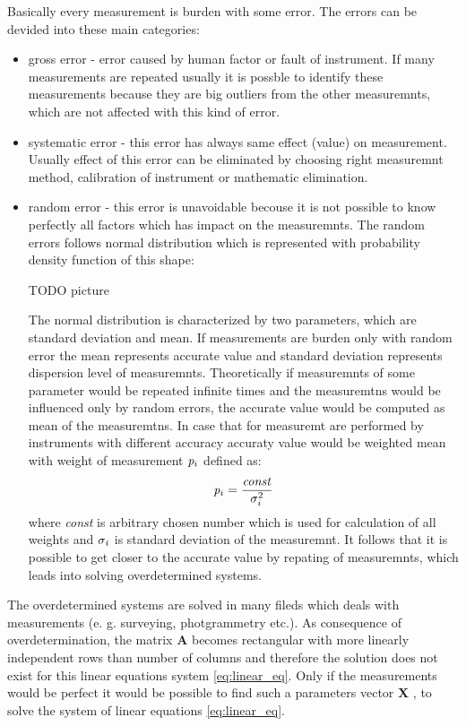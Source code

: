 \documentclass[a4paper,12pt]{report}
\newcommand{\ematr}[1]{
{\bf #1}
}
\newcommand{\evect}[1]{
{\bf #1}
}
\newcommand{\escal}[1]{
{\it #1}
}
\begin{document}
Basically every measurement is burden with some error. The errors can be devided into these main categories:  
\begin{itemize}
\item gross error - error caused by human factor or fault of instrument. If many measurements are repeated
usually it is possble to identify these measurements because they are big outliers from the other measuremnts, which are not affected with this 
kind of error.
\item systematic error - this error has always same effect (value) on measurement.  Usually effect of this error can be 
eliminated by choosing right measuremnt method, calibration of instrument or mathematic elimination.
\item random error - this error is unavoidable becouse it is not possible to know perfectly all factors which has impact 
on the measuremnts. The random errors follows normal distribution which is represented with probability density function of this shape:

TODO picture


The normal distribution is characterized by two parameters, which are standard deviation and  mean. 
If measurements are burden only with random error the mean represents accurate value and standard deviation represents 
dispersion level of measuremnts. 
Theoretically  if measuremnts of some parameter would be repeated infinite times and the measuremtns would be influenced only by random errors,
the accurate value would be computed as  mean of the measuremtns. In case that for measuremt are performed by instruments with different accuracy
 accuraty value would be weighted mean with weight of measurement $\escal{p}_{i}$ defined as:
\begin{equation}
\escal{p}_{i} = \frac{\escal{const}}{\escal{\sigma}_{i}^{2}}
\end{equation} 
where \escal{const} is arbitrary chosen number which is used for calculation of all weights and $\escal{\sigma_{i}}$ is standard deviation of the measuremnt.
It follows that it is possible to get closer to the accurate value by repating of measuremnts, which 
leads into solving overdetermined systems. 

\end{itemize}

The overdetermined systems are solved in many fileds which deals with measurements (e. g. 
surveying, photgrammetry etc.).
As consequence of overdetermination, the matrix \ematr{A} becomes rectangular with more linearly independent rows than  number of columns 
and therefore the solution does not exist for this linear equations system \eqref{eq:linear_eq}.
Only if the measurements would be perfect it would be possible to find such a parameters vector \evect{X}, to 
solve the system of linear equations \eqref{eq:linear_eq}. 
\end{document}
